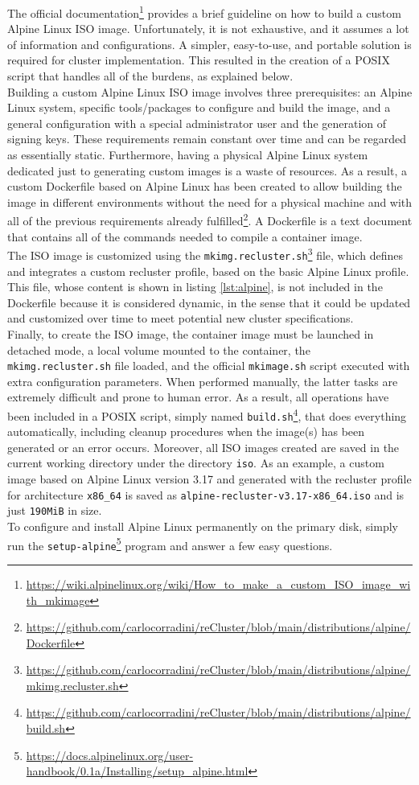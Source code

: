 The official documentation\footnote{\url{https://wiki.alpinelinux.org/wiki/How_to_make_a_custom_ISO_image_with_mkimage}}
provides a brief guideline on how to build a custom Alpine Linux ISO image. Unfortunately,
it is not exhaustive, and it assumes a lot of information and configurations. A
simpler, easy-to-use, and portable solution is required for cluster
implementation. This resulted in the creation of a POSIX script that handles all
of the burdens, as explained below. \\ %
Building a custom Alpine Linux ISO image involves three prerequisites: an Alpine
Linux system, specific tools/packages to configure and build the image, and a general
configuration with a special administrator user and the generation of signing keys.
These requirements remain constant over time and can be regarded as essentially
static. Furthermore, having a physical Alpine Linux system dedicated just to
generating custom images is a waste of resources. As a result, a custom
Dockerfile based on Alpine Linux has been created to allow building the image in
different environments without the need for a physical machine and with all of
the previous requirements already fulfilled\footnote{\url{https://github.com/carlocorradini/reCluster/blob/main/distributions/alpine/Dockerfile}}.
A Dockerfile is a text document that contains all of the commands needed to compile
a container image\cite{dockerfile}. \\ %
The ISO image is customized using the \texttt{mkimg.recluster.sh}\footnote{\url{https://github.com/carlocorradini/reCluster/blob/main/distributions/alpine/mkimg.recluster.sh}}
file, which defines and integrates a custom recluster profile, based on the basic
Alpine Linux profile. This file, whose content is shown in listing \ref{lst:alpine},
is not included in the Dockerfile because it is considered dynamic, in the sense
that it could be updated and customized over time to meet potential new cluster specifications.
\\ %
Finally, to create the ISO image, the container image must be launched in detached
mode, a local volume mounted to the container, the \texttt{mkimg.recluster.sh}
file loaded, and the official \texttt{mkimage.sh} script executed with extra
configuration parameters. When performed manually, the latter tasks are
extremely difficult and prone to human error. As a result, all operations have
been included in a POSIX script, simply named \texttt{build.sh}\footnote{\url{https://github.com/carlocorradini/reCluster/blob/main/distributions/alpine/build.sh}},
that does everything automatically, including cleanup procedures when the image(s)
has been generated or an error occurs. Moreover, all ISO images created are saved
in the current working directory under the directory \texttt{iso}. As an example,
a custom image based on Alpine Linux version 3.17 and generated with the
recluster profile for architecture \texttt{x86\_64} is saved as \texttt{alpine-recluster-v3.17-x86\_64.iso}
and is just \texttt{190MiB} in size. \\ %
To configure and install Alpine Linux permanently on the primary disk, simply
run the \texttt{setup-alpine}\footnote{\url{https://docs.alpinelinux.org/user-handbook/0.1a/Installing/setup_alpine.html}}
program and answer a few easy questions.


